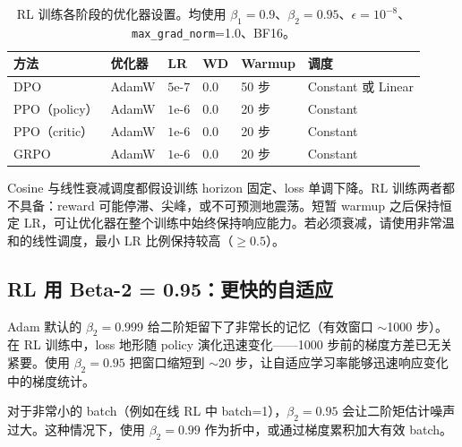 \begin{table}[ht!]
\centering
\caption{RL 训练各阶段的优化器设置。均使用 $\beta_1=0.9$、$\beta_2=0.95$、$\epsilon=10^{-8}$、\texttt{max\_grad\_norm}=1.0、BF16。}
{\footnotesize
\noindent\begin{tabularx}{\linewidth}{@{}l l l l l Z{1}@{}}
\toprule
\textbf{方法} & \textbf{优化器} & \textbf{LR} & \textbf{WD} & \textbf{Warmup} & \textbf{调度} \\
\midrule
DPO & AdamW & $5\text{e-}7$ & 0.0 & 50 步 & Constant 或 Linear \\
PPO（policy） & AdamW & $1\text{e-}6$ & 0.0 & 20 步 & Constant \\
PPO（critic） & AdamW & $1\text{e-}6$ & 0.0 & 20 步 & Constant \\
GRPO & AdamW & $1\text{e-}6$ & 0.0 & 20 步 & Constant \\
\bottomrule
\end{tabularx}
}
\end{table}

\begin{intuitionbox}
Cosine 与线性衰减调度都假设训练 horizon 固定、loss 单调下降。RL 训练两者都不具备：reward 可能停滞、尖峰，或不可预测地震荡。短暂 warmup 之后保持恒定 LR，可让优化器在整个训练中始终保持响应能力。若必须衰减，请使用非常温和的线性调度，最小 LR 比例保持较高（$\geq 0.5$）。
\end{intuitionbox}

\subsection{RL 用 Beta-2 = 0.95：更快的自适应}
\label{beta-2-0.95-for-rl-faster-adaptation}

Adam 默认的 $\beta_2 = 0.999$ 给二阶矩留下了非常长的记忆（有效窗口 $\sim$1000 步）。在 RL 训练中，loss 地形随 policy 演化迅速变化——1000 步前的梯度方差已无关紧要。使用 $\beta_2 = 0.95$ 把窗口缩短到 $\sim$20 步，让自适应学习率能够迅速响应变化中的梯度统计。

\begin{warningbox}[beta2 = 0.95 反受其害的场景]
对于非常小的 batch（例如在线 RL 中 batch=1），$\beta_2 = 0.95$ 会让二阶矩估计噪声过大。这种情况下，使用 $\beta_2 = 0.99$ 作为折中，或通过梯度累积加大有效 batch。
\end{warningbox}

